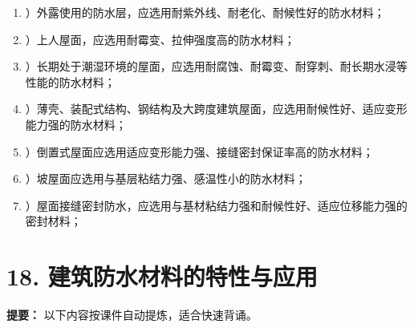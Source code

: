 \documentclass[UTF8,fontset=fandol,11pt]{ctexart}
\begin{document}
\begin{enumerate}[label=\arabic*.]
\item ）外露使用的防水层，应选用耐紫外线、耐老化、耐候性好的防水材料；

\item ）上人屋面，应选用耐霉变、拉伸强度高的防水材料；

\item ）长期处于潮湿环境的屋面，应选用耐腐蚀、耐霉变、耐穿刺、耐长期水浸等性能的防水材料；

\item ）薄壳、装配式结构、钢结构及大跨度建筑屋面，应选用耐候性好、适应变形能力强的防水材料；

\item ）倒置式屋面应选用适应变形能力强、接缝密封保证率高的防水材料；

\item ）坡屋面应选用与基层粘结力强、感温性小的防水材料；

\item ）屋面接缝密封防水，应选用与基材粘结力强和耐候性好、适应位移能力强的密封材料；

\end{enumerate}

\newpage

\section*{18. 建筑防水材料的特性与应用}


\begin{mainbox}

\textbf{提要：} 以下内容按课件自动提炼，适合快速背诵。

\end{mainbox}
\end{document}
